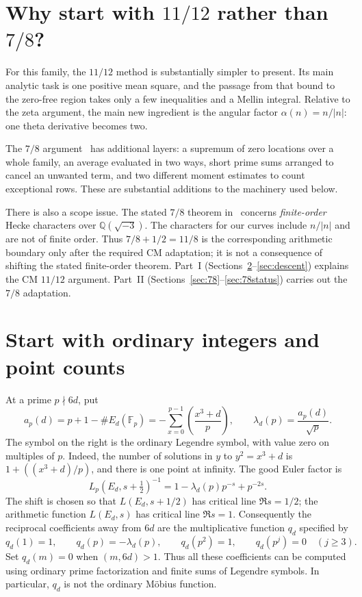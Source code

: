 \documentclass[11pt]{article}
\numberwithin{equation}{section}
\begin{document}
\section{Why start with \texorpdfstring{$11/12$}{11/12} rather than \texorpdfstring{$7/8$}{7/8}?}

For this family, the $11/12$ method is substantially simpler to present.
Its main analytic task is one positive mean square, and the passage from
that bound to the zero-free region takes only a few inequalities and a
Mellin integral. Relative to the zeta argument, the main new ingredient is
the angular factor $\alpha(n)=n/|n|$: one theta derivative becomes two.

The $7/8$ argument~\cite{OAI78,G78} has additional layers: a supremum of
zero locations over a whole family, an average evaluated in two ways,
short prime sums arranged to cancel an unwanted term, and two different
moment estimates to count exceptional rows. These are substantial additions
to the machinery used below.

There is also a scope issue. The stated $7/8$ theorem in~\cite{OAI78}
concerns \emph{finite-order} Hecke characters over $\mathbb Q(\sqrt{-3})$.
The characters for our curves include $n/|n|$ and are not of finite order.
Thus $7/8+1/2=11/8$ is the corresponding arithmetic boundary only
after the required CM adaptation; it is not a consequence of
shifting the stated finite-order theorem. Part~I (Sections~\ref{sec:integer}--\ref{sec:descent})
explains the CM $11/12$ argument. Part~II
(Sections~\ref{sec:78}--\ref{sec:78status}) carries out the $7/8$
adaptation.

\section{Start with ordinary integers and point counts}\label{sec:integer}

At a prime $p\nmid6d$, put
\begin{equation}\label{eq:d002}
 a_p(d)=p+1-\#E_d(\mathbb F_p)
       =-\sum_{x=0}^{p-1}\left(\frac{x^3+d}{p}\right),
 \qquad \lambda_d(p)=\frac{a_p(d)}{\sqrt p}.
\end{equation}
The symbol on the right is the ordinary Legendre symbol, with value zero
on multiples of $p$. Indeed, the number of solutions in $y$ to
$y^2=x^3+d$ is $1+((x^3+d)/p)$, and there is one point at infinity.
The good Euler factor is
\begin{equation}\label{eq:d003}
 L_p(E_d,s+\tfrac12)^{-1}
 =1-\lambda_d(p)p^{-s}+p^{-2s}.
\end{equation}
The shift is chosen so that $L(E_d,s+1/2)$ has critical line
$\Re s=1/2$; the arithmetic function $L(E_d,s)$ has critical line
$\Re s=1$.
Consequently the reciprocal coefficients away from $6d$ are the
multiplicative function $q_d$ specified by
\begin{equation}\label{eq:qd}
 q_d(1)=1,\qquad q_d(p)=-\lambda_d(p),\qquad
 q_d(p^2)=1,\qquad q_d(p^j)=0\quad(j\ge3).
\end{equation}
Set $q_d(m)=0$ when $(m,6d)>1$. Thus all these coefficients can be
computed using ordinary prime factorization and finite sums of Legendre
symbols. In particular, $q_d$ is not the ordinary M\"obius function.
\end{document}
